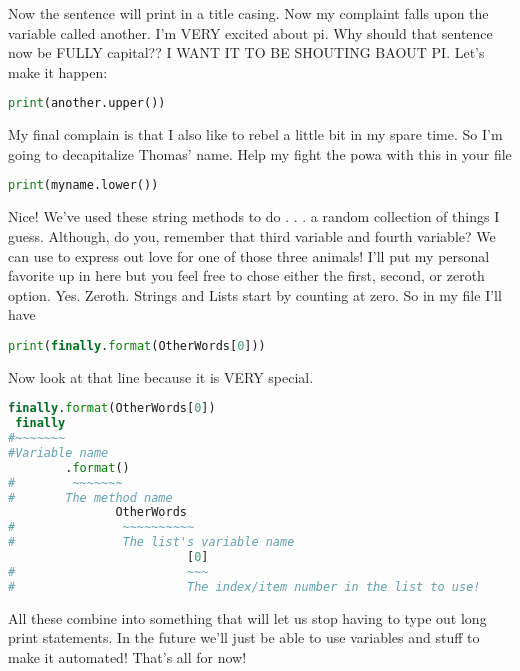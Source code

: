 \documentclass{article}
\begin{document}
Now the sentence will print in a title casing. 
Now my complaint falls upon the variable called another. 
I'm VERY excited about pi.
Why should that sentence now be FULLY capital??
I WANT IT TO BE SHOUTING BAOUT PI. 
Let's make it happen:
\begin{lstlisting}[language=Python]
print(another.upper())
\end{lstlisting}

My final complain is that I also like to rebel a little bit in my spare time. 
So I'm going to decapitalize Thomas' name. 
Help my fight the powa with this in your file
\begin{lstlisting}[language=Python]
print(myname.lower())
\end{lstlisting}

Nice! 
We've used these string methods to do . . . a random collection of things I guess.
Although, do you, remember that third variable and fourth variable?
We can use to express out love for one of those three animals! 
I'll put my personal favorite up in here but you feel free to chose either the 
first, second, or zeroth option. 
Yes. 
Zeroth. 
Strings and Lists start by counting at zero. 
So in my file I'll have
\begin{lstlisting}[language=Python]
print(finally.format(OtherWords[0]))
\end{lstlisting}

Now look at that line because it is VERY special. 
\begin{lstlisting}[language=Python]
finally.format(OtherWords[0])
 finally
#~~~~~~~        
#Variable name 
        .format()
#        ~~~~~~~
#       The method name
               OtherWords
#               ~~~~~~~~~~
#               The list's variable name
                         [0]
#                        ~~~
#                        The index/item number in the list to use!
\end{lstlisting}
All these combine into something that will let us stop having to type out long 
print statements. 
In the future we'll just be able to use variables and stuff to make it automated!
That's all for now!
\end{document}
